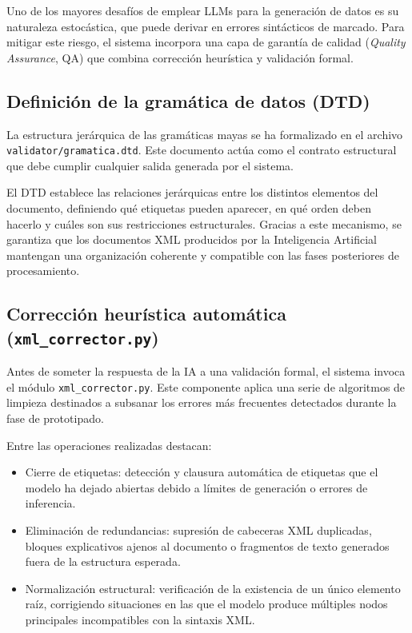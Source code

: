 Uno de los mayores desafíos de emplear LLMs para la generación de datos es su naturaleza estocástica, que puede derivar en errores sintácticos de marcado. Para mitigar este riesgo, el sistema incorpora una capa de garantía de calidad (\textit{Quality Assurance}, QA) que combina corrección heurística y validación formal.

\subsection{Definición de la gramática de datos (DTD)}

La estructura jerárquica de las gramáticas mayas se ha formalizado en el archivo \texttt{validator/gramatica.dtd}. Este documento actúa como el contrato estructural que debe cumplir cualquier salida generada por el sistema.

El DTD establece las relaciones jerárquicas entre los distintos elementos del documento, definiendo qué etiquetas pueden aparecer, en qué orden deben hacerlo y cuáles son sus restricciones estructurales. Gracias a este mecanismo, se garantiza que los documentos XML producidos por la Inteligencia Artificial mantengan una organización coherente y compatible con las fases posteriores de procesamiento.

\subsection{Corrección heurística automática (\texttt{xml\_corrector.py})}

Antes de someter la respuesta de la IA a una validación formal, el sistema invoca el módulo \texttt{xml\_corrector.py}. Este componente aplica una serie de algoritmos de limpieza destinados a subsanar los errores más frecuentes detectados durante la fase de prototipado.

Entre las operaciones realizadas destacan:

\begin{itemize}
    \item Cierre de etiquetas: detección y clausura automática de etiquetas que el modelo ha dejado abiertas debido a límites de generación o errores de inferencia.

    \item Eliminación de redundancias: supresión de cabeceras XML duplicadas, bloques explicativos ajenos al documento o fragmentos de texto generados fuera de la estructura esperada.

    \item Normalización estructural: verificación de la existencia de un único elemento raíz, corrigiendo situaciones en las que el modelo produce múltiples nodos principales incompatibles con la sintaxis XML.
\end{itemize}

